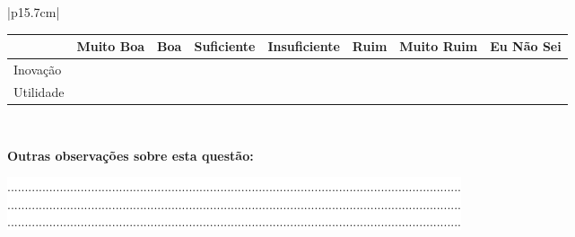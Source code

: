 \begin{longtable}{|p{15.7cm}|}
	\tiny \begin{tabularx}{15.7 cm}{|X|X|X|X|X|X|X|X|}
	\hline
	& Muito Boa & Boa  & Suficiente & Insuficiente & Ruim & Muito Ruim & Eu Não Sei\\
	\hline
	Inovação  &   &   &   &   &  &  &  \\
	\hline
	Utilidade &   &   &   &   &  &  &  \\
	\hline
\end{tabularx} \\
\begin{Spacing}{1.0} \end{Spacing}
\begin{Spacing}{0.8} 
	\textbf{Outras observações sobre esta questão:} \end{Spacing} 
\begin{Spacing}{2.5} \end{Spacing} 
\colorbox{white}{ .................................................................................................................................. } \\
\colorbox{white}{ .................................................................................................................................. } \\
\colorbox{white}{ .................................................................................................................................. } \\
\hline
\end{longtable}

\bigskip

